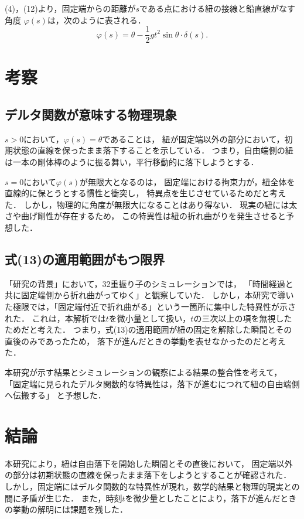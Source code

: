 \documentclass[11pt, a4paper]{ltjsarticle}
\begin{document}
(4)，(12)より，固定端からの距離が$s$である点における紐の接線と鉛直線がなす角度
$\varphi \left(s\right)$は，次のように表される．
\begin{equation}
  \varphi\left(s\right) = \theta - \frac{1}{2} g t^2 \sin \theta \cdot \delta \left(s\right).
\end{equation}

\section{考察}
\subsection{デルタ関数が意味する物理現象}
$s > 0$において，$\varphi\left(s\right) = \theta$であることは，
紐が固定端以外の部分において，初期状態の直線を保ったまま落下することを示している．
つまり，自由端側の紐は一本の剛体棒のように振る舞い，平行移動的に落下しようとする．

$s = 0$において$\varphi\left(s\right)$が無限大となるのは，
固定端における拘束力が，紐全体を直線的に保とうとする慣性と衝突し，
特異点を生じさせているためだと考えた．
しかし，物理的に角度が無限大になることはあり得ない．
現実の紐には太さや曲げ剛性が存在するため，
この特異性は紐の折れ曲がりを発生させると予想した．

\subsection{式(13)の適用範囲がもつ限界}
「研究の背景」において，32重振り子のシミュレーションでは，
「時間経過と共に固定端側から折れ曲がってゆく」と観察していた．
しかし，本研究で導いた極限では，「固定端付近で折れ曲がる」という一箇所に集中した特異性が示された．
これは，本解析では$t$を微小量として扱い，$t$の三次以上の項を無視したためだと考えた．
つまり，式(13)の適用範囲が紐の固定を解除した瞬間とその直後のみであったため，
落下が進んだときの挙動を表せなかったのだと考えた．

本研究が示す結果とシミュレーションの観察による結果の整合性を考えて，
「固定端に見られたデルタ関数的な特異性は，落下が進むにつれて紐の自由端側へ伝搬する」
と予想した．

\section{結論}
本研究により，紐は自由落下を開始した瞬間とその直後において，
固定端以外の部分は初期状態の直線を保ったまま落下をしようとすることが確認された．
しかし，固定端にはデルタ関数的な特異性が現れ，数学的結果と物理的現実との間に矛盾が生じた．
また，時刻$t$を微少量としたことにより，落下が進んだときの挙動の解明には課題を残した．
\end{document}
